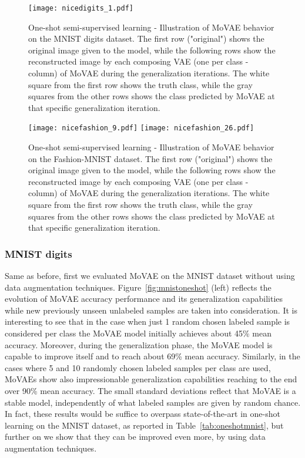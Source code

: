 \documentclass[sigconf,authorversion=true]{aamas}  %
\begin{document}
\begin{figure}[t!]
\centering
\texttt{[image: nicedigits\_1.pdf]}
\caption{One-shot semi-supervised learning - Illustration of MoVAE behavior on the MNIST digits dataset. The first row ("original") shows the original image given to the model, while the following rows show the reconstructed image by each composing VAE (one per class - column) of MoVAE during the generalization iterations. The white square from the first row shows the truth class, while the gray squares from the other rows shows the class predicted by MoVAE at that specific generalization iteration.}
\label{fig:mnistlearnnice}
\end{figure}\begin{figure*}[t]
\centering
\texttt{[image: nicefashion\_9.pdf]}
\texttt{[image: nicefashion\_26.pdf]}
\vspace{-1.5em}
\caption{One-shot semi-supervised learning - Illustration of MoVAE behavior on the Fashion-MNIST dataset. The first row ("original") shows the original image given to the model, while the following rows show the reconstructed image by each composing VAE (one per class - column) of MoVAE during the generalization iterations. The white square from the first row shows the truth class, while the gray squares from the other rows shows the class predicted by MoVAE at that specific generalization iteration.}
\label{fig:fashionlearnnice}
\end{figure*}\subsubsection{MNIST digits}

Same as before, first we evaluated MoVAE on the MNIST dataset without using data augmentation techniques. Figure~\ref{fig:mnistoneshot} (left) reflects the evolution of MoVAE accuracy performance and its generalization capabilities while new previously unseen unlabeled samples are taken into consideration. It is interesting to see that in the case when just 1 random chosen labeled sample is considered per class the MoVAE model initially achieves about 45\% mean accuracy. Moreover, during the generalization phase, the MoVAE model is capable to improve itself and to reach about 69\% mean accuracy. Similarly, in the cases where 5 and 10 randomly chosen labeled samples per class are used, MoVAEs show also impressionable generalization capabilities reaching to the end over 90\% mean accuracy. The small standard deviations reflect that MoVAE is a stable model, independently of what labeled samples are given by random chance. In fact, these results would be suffice to overpass state-of-the-art in one-shot learning on the MNIST dataset, as reported in Table~\ref{tab:oneshotmnist}, but further on we show that they can be improved even more, by using data augmentation techniques.
\end{document}
